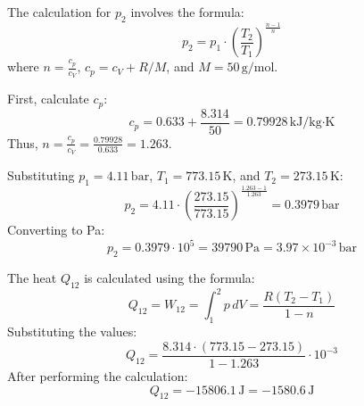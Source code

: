 The calculation for \( p_2 \) involves the formula:  
\[
p_2 = p_1 \cdot \left( \frac{T_2}{T_1} \right)^{\frac{n-1}{n}}
\]  
where \( n = \frac{c_p}{c_V} \), \( c_p = c_V + R/M \), and \( M = 50 \, \text{g/mol} \).  

First, calculate \( c_p \):  
\[
c_p = 0.633 + \frac{8.314}{50} = 0.79928 \, \text{kJ/kg·K}
\]  
Thus, \( n = \frac{c_p}{c_V} = \frac{0.79928}{0.633} = 1.263 \).  

Substituting \( p_1 = 4.11 \, \text{bar} \), \( T_1 = 773.15 \, \text{K} \), and \( T_2 = 273.15 \, \text{K} \):  
\[
p_2 = 4.11 \cdot \left( \frac{273.15}{773.15} \right)^{\frac{1.263-1}{1.263}} = 0.3979 \, \text{bar}
\]  
Converting to Pa:  
\[
p_2 = 0.3979 \cdot 10^5 = 39790 \, \text{Pa} = 3.97 \times 10^{-3} \, \text{bar}
\]

The heat \( Q_{12} \) is calculated using the formula:  
\[
Q_{12} = W_{12} = \int_{1}^{2} p \, dV = \frac{R(T_2 - T_1)}{1 - n}
\]  
Substituting the values:  
\[
Q_{12} = \frac{8.314 \cdot (773.15 - 273.15)}{1 - 1.263} \cdot 10^{-3}
\]  
After performing the calculation:  
\[
Q_{12} = -15806.1 \, \text{J} = -1580.6 \, \text{J}
\]